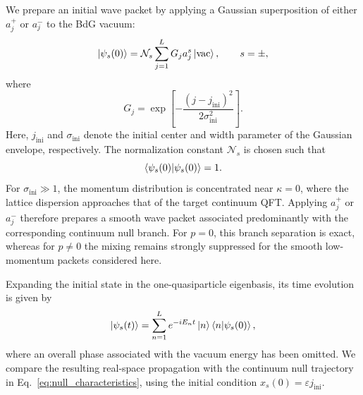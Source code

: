 \documentclass[reprint,amsmath,amssymb,aps,showkeys,superscriptaddress]{revtex4-2}
\begin{document}
We prepare an initial wave packet by applying a Gaussian
superposition of either $a_j^+$ or $a_j^-$ to the BdG vacuum:
\begin{equation}
  \ket{\psi_s(0)}
  =
  \mathcal{N}_s
  \sum_{j=1}^{L}
  G_j a_j^s
  \ket{\mathrm{vac}},
  \qquad
  s=\pm,
  \label{eq:initial_state_a}
\end{equation}
where
\begin{equation}
  G_j
  =
  \exp\left[
    -\frac{(j-j_{\mathrm{ini}})^2}
           {2\sigma_{\mathrm{ini}}^2}
  \right].
  \label{eq:Gaussian_envelope}
\end{equation}
Here, $j_{\mathrm{ini}}$ and $\sigma_{\mathrm{ini}}$ denote the
initial center and width parameter of the Gaussian envelope,
respectively. The normalization constant $\mathcal{N}_s$ is chosen
such that
\begin{equation}
  \braket{\psi_s(0)|\psi_s(0)}=1.
  \label{eq:initial_state_normalization}
\end{equation}
For $\sigma_{\mathrm{ini}}\gg1$, the momentum distribution is
concentrated near $\kappa=0$, where the lattice dispersion
approaches that of the target continuum QFT. Applying $a_j^+$ or
$a_j^-$ therefore prepares a smooth wave packet associated
predominantly with the corresponding continuum null branch. For
$p=0$, this branch separation is exact, whereas for $p\neq0$ the
mixing remains strongly suppressed for the smooth low-momentum
packets considered here.

Expanding the initial state in the one-quasiparticle eigenbasis, its
time evolution is given by
\begin{equation}
  \ket{\psi_s(t)}
  =
  \sum_{n=1}^{L}
  e^{-iE_nt}
  \ket{n}
  \braket{n|\psi_s(0)},
  \label{eq:time_evolved_state}
\end{equation}
where an overall phase associated with the vacuum energy has been
omitted. We compare the resulting real-space propagation with the
continuum null trajectory in Eq.~\eqref{eq:null_characteristics},
using the initial condition
$x_s(0)=\varepsilon j_{\mathrm{ini}}$.
\end{document}
